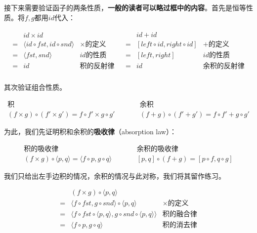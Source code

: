 \documentclass{article}
\begin{document}
\begin{mdframed}
接下来需要验证函子的两条性质，\textbf{一般的读者可以略过框中的内容}。首先是恒等性质。将$f, g$都用$id$代入：

\[
\begin{array}{lr}
  \begin{array}{cll}
    & id \times id & \\
  = & \langle id \circ fst, id \circ snd \rangle & \text{$\times$的定义} \\
  = & \langle fst, snd \rangle & \text{$id$的性质} \\
  = & id & \text{积的反射律} \\
  \end{array}
  &
  \begin{array}{cll}
    & id + id & \\
  = & [ left \circ id, right \circ id ] & \text{$+$的定义} \\
  = & [ left, right] & \text{$id$的性质} \\
  = & id & \text{余积的反射律} \\
  \end{array}
\end{array}
\]

其次验证组合性质。

\[
\begin{array}{ccc}
\text{积} & \quad \quad & \text{余积} \\
 (f \times g) \circ (f' \times g') = f \circ f' \times g \circ g'
 & \quad \quad &
 (f + g) \circ (f' + g') = f \circ f' + g \circ g'
\end{array}
\]

为此，我们先证明积和余积的\textbf{吸收律}（absorption law）：

\[
\begin{array}{ccc}
  \text{积的吸收律} & \quad \quad & \text{余积的吸收律} \\
  (f \times g) \circ \langle p, q \rangle = \langle f \circ p, g \circ q \rangle
  & \quad \quad &
  [p, q] \circ (f + g) = [p \circ f, q \circ g]
\end{array}
\]

我们只给出左手边积的情况，余积的情况与此对称，我们将其留作练习。

\[
\begin{array}{cll}
   & (f \times g) \circ \langle p, q \rangle & \\
 = & \langle f \circ fst, g \circ snd \rangle \circ \langle p, q \rangle & \text{$\times$的定义} \\
 = & \langle f \circ fst \circ \langle p, q \rangle, g \circ snd \circ \langle p, q \rangle \rangle & \text{积的融合律} \\
 = & \langle f \circ p, g \circ q \rangle & \text{积的消去律} \\
\end{array}
\]


\end{mdframed}
\end{document}
